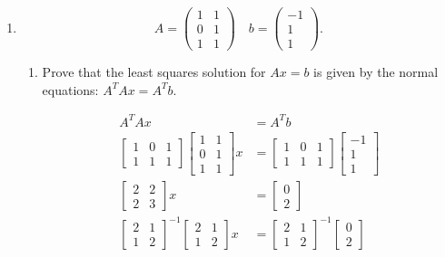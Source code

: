 \documentclass{zc-ust-hw}
\begin{document}
\begin{enumerate}
  \item \[
      A= \begin{pmatrix} 1&1\\0&1\\1&1 \end{pmatrix} \quad b= \begin{pmatrix} -1\\1\\1 \end{pmatrix}
  .\] 
    \begin{enumerate}
      \item Prove that the least squares solution for \(Ax=b\) is given by the
        normal equations: \(A^TAx=A^Tb\).
        \begin{sol}
          \begin{align}
            A^TAx &= A^Tb \\
            \begin{bmatrix} 1 & 0 & 1 \\ 1 & 1 & 1 \end{bmatrix} \begin{bmatrix} 1 & 1 \\ 0 & 1 \\ 1 & 1 \end{bmatrix} x &= \begin{bmatrix} 1 & 0 & 1 \\ 1 & 1 & 1 \end{bmatrix} \begin{bmatrix} -1 \\ 1 \\ 1 \end{bmatrix} \\
            \begin{bmatrix}2&2\\2&3\end{bmatrix} x &= \begin{bmatrix} 0 \\ 2 \end{bmatrix} \\
            \begin{bmatrix} 2 & 1 \\ 1 & 2 \end{bmatrix}^{-1} \begin{bmatrix} 2 & 1 \\ 1 & 2 \end{bmatrix} x &= \begin{bmatrix} 2 & 1 \\ 1 & 2 \end{bmatrix}^{-1} \begin{bmatrix} 0 \\ 2 \end{bmatrix} \\

\end{align}
\end{sol}
\end{enumerate}
\end{enumerate}
\end{document}
